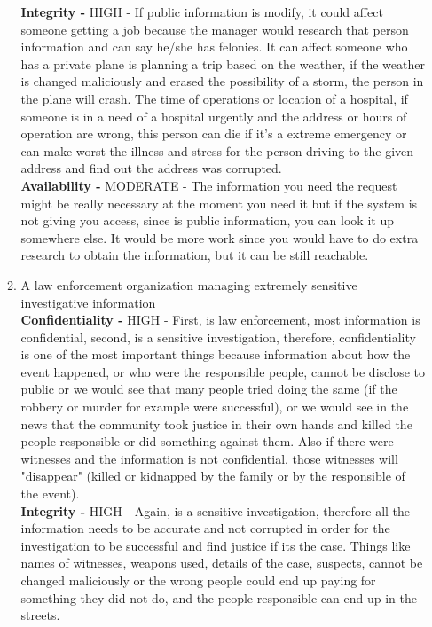 \documentclass[12pt]{article}
\begin{document}
\begin{enumerate}
\begin{enumerate}
		\textbf{Integrity - } HIGH - If public information is modify, it could affect someone getting a job because the manager would research that person information and can say he/she has felonies. It can affect someone who has a private plane is planning a trip based on the weather, if the weather is changed maliciously and erased the possibility of a storm, the person in the plane will crash. The time of operations or location of a hospital, if someone is in a need of a hospital urgently and the address or hours of operation are wrong, this person can die if it's a extreme emergency or can make worst the illness and stress for the person driving to the given address and find out the address was corrupted.\\
		
		\textbf{Availability - } MODERATE - The information you need the request might be really necessary at the moment you need it but if the system is not giving you access, since is public information, you can look it up somewhere else. It would be more work since you would have to do extra research to obtain the information, but it can be still reachable.\\
		
		\item{A law enforcement organization managing extremely sensitive investigative information} \\
		
		\textbf{Confidentiality - } HIGH - First, is law enforcement, most information is confidential, second, is a sensitive investigation, therefore, confidentiality is one of the most important things because information about how the event happened, or who were the responsible people, cannot be disclose to public or we would see that many people tried doing the same (if the robbery or murder for example were successful), or we would see in the news that the community took justice in their own hands and killed the people responsible or did something against them. Also if there were witnesses and the information is not confidential, those witnesses will "disappear" (killed or kidnapped by the family or by the responsible of the event).  \\
		
		\textbf{Integrity - } HIGH - Again, is a sensitive investigation, therefore all the information needs to be accurate and not corrupted in order for the investigation to be successful and find justice if its the case. Things like names of witnesses, weapons used, details of the case, suspects, cannot be changed maliciously or the wrong people could end up paying for something they did not do, and the people responsible can end up in the streets. \\
		

\end{enumerate}
\end{enumerate}
\end{document}
